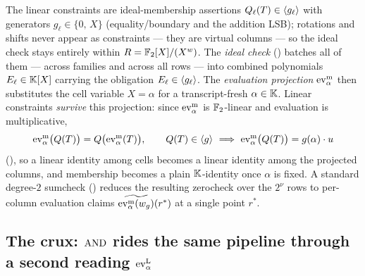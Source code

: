 The linear constraints are ideal-membership assertions
$Q_\ell(T)\in\langle g_\ell \rangle$ with generators
$g_\ell\in\{0,\,X\}$ (equality/boundary and the addition LSB); rotations
and shifts never appear as constraints --- they are virtual columns --- so
the ideal check stays entirely within $R=\mathbb{F}_2[X]/(X^{w})$.
The \emph{ideal check} () batches all of
them --- across families and across all rows --- into combined polynomials
$E_\ell\in\mathbb{K}[X]$ carrying the obligation $E_\ell\in\langle g_\ell \rangle$. The
\emph{evaluation projection} $\operatorname{ev}^{\mathrm{m}}_{\alpha}$ then substitutes the cell variable
$X=\alpha$ for a transcript-fresh $\alpha\in\mathbb{K}$. Linear constraints
\emph{survive} this projection: since $\operatorname{ev}^{\mathrm{m}}_{\alpha}$ is $\mathbb{F}_2$-linear and
evaluation is multiplicative, 
\[
  \psia\bigl(Q(T)\bigr)=Q\bigl(\psia(T)\bigr),
  \qquad
  Q(T)\in\ideal{g}\ \Longrightarrow\ \psia\bigl(Q(T)\bigr)=g(\alpha)\cdot u
\]
(), so a linear identity among cells becomes a
linear identity among the projected columns, and membership becomes a plain
$\mathbb{K}$-identity once $\alpha$ is fixed. A standard degree-$2$ sumcheck
() reduces the resulting zerocheck over the $2^{\nu}$
rows to per-column evaluation claims $\widetilde{\operatorname{ev}^{\mathrm{m}}_{\alpha}(w_g)}(r^*)$ at a single
point $r^*$.

\subsection{The crux: $\operatorname{AND}$ rides the same pipeline through a second reading $\operatorname{ev}^{\mathrm{L}}_{\alpha}$}
\label{sec:overview-crux}

